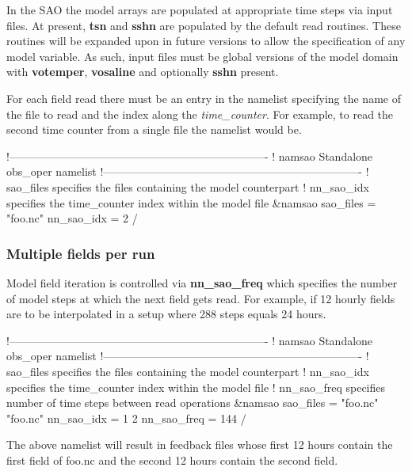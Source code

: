 \documentclass[../main/NEMO_manual]{subfiles}
\begin{document}
In the SAO the model arrays are populated at appropriate time steps via input files.
At present, \textbf{tsn} and \textbf{sshn} are populated by the default read routines.
These routines will be expanded upon in future versions to allow the specification of any model variable.
As such, input files must be global versions of the model domain with
\textbf{votemper}, \textbf{vosaline} and optionally \textbf{sshn} present.

For each field read there must be an entry in the  namelist specifying
the name of the file to read and the index along the \emph{time\_counter}.
For example, to read the second time counter from a single file the namelist would be.

\begin{forlines}
!----------------------------------------------------------------------
!       namsao Standalone obs_oper namelist
!----------------------------------------------------------------------
!   sao_files    specifies the files containing the model counterpart
!   nn_sao_idx   specifies the time_counter index within the model file
&namsao
   sao_files = "foo.nc"
   nn_sao_idx = 2
/
\end{forlines}

\subsubsection{Multiple fields per run}

Model field iteration is controlled via \textbf{nn\_sao\_freq} which
specifies the number of model steps at which the next field gets read.
For example, if 12 hourly fields are to be interpolated in a setup where 288 steps equals 24 hours.

\begin{forlines}
!----------------------------------------------------------------------
!       namsao Standalone obs_oper namelist
!----------------------------------------------------------------------
!   sao_files    specifies the files containing the model counterpart
!   nn_sao_idx   specifies the time_counter index within the model file
!   nn_sao_freq  specifies number of time steps between read operations
&namsao
   sao_files = "foo.nc" "foo.nc"
   nn_sao_idx = 1 2
   nn_sao_freq = 144
/
\end{forlines}

The above namelist will result in feedback files whose first 12 hours contain the first field of foo.nc and
the second 12 hours contain the second field.
\end{document}
